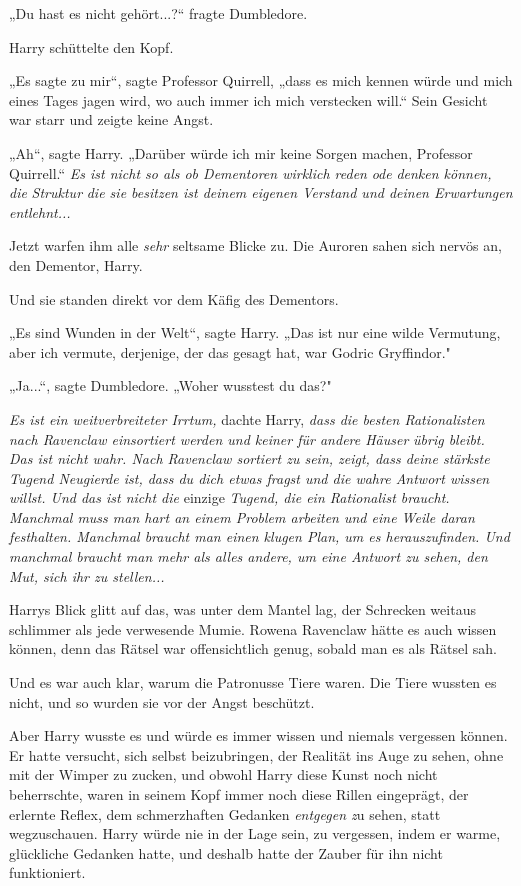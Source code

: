 {„Du hast es nicht gehört...?“ fragte Dumbledore.

Harry schüttelte den Kopf.

„Es sagte zu mir“, sagte Professor Quirrell, „dass es mich kennen würde und mich eines Tages jagen wird, wo auch immer ich mich verstecken will.“ Sein Gesicht war starr und zeigte keine Angst.

„Ah“, sagte Harry. „Darüber würde ich mir keine Sorgen machen, Professor Quirrell.“ \emph{Es ist nicht so als ob Dementoren wirklich reden} \emph{ode} \emph{denken können, die} \emph{Struktur} \emph{die sie besitzen ist deinem eigenen Verstand und deinen Erwartungen entlehnt...}

Jetzt warfen ihm alle \emph{sehr} seltsame Blicke zu. Die Auroren sahen sich nervös an, den Dementor, Harry.

Und sie standen direkt vor dem Käfig des Dementors.

„Es sind Wunden in der Welt“, sagte Harry. „Das ist nur eine wilde Vermutung, aber ich vermute, derjenige, der das gesagt hat, war Godric Gryffindor."

„Ja...“, sagte Dumbledore. „Woher wusstest du das?"

\emph{Es ist ein weitverbreiteter Irrtum,} dachte Harry, \emph{dass die besten Rationalisten nach Ravenclaw einsortiert werden und keiner für andere Häuser} \emph{übrig bleibt. Das ist nicht wahr. Nach Ravenclaw sortiert zu sein, zeigt, dass deine stärkste Tugend Neugierde ist, dass du dich etwas fragst und die wahre Antwort wissen willst. Und das ist nicht die} einzige \emph{Tugend, die ein Rationalist braucht. Manchmal muss man hart an einem Problem arbeiten und eine Weile daran festhalten. Manchmal braucht man einen klugen Plan, um es herauszufinden. Und manchmal braucht man mehr als alles andere, um eine Antwort zu sehen, den Mut, sich ihr zu stellen...}

Harrys Blick glitt auf das, was unter dem Mantel lag, der Schrecken weitaus schlimmer als jede verwesende Mumie. Rowena Ravenclaw hätte es auch wissen können, denn das Rätsel war offensichtlich genug, sobald man es als Rätsel sah.

Und es war auch klar, warum die Patronusse Tiere waren. Die Tiere wussten es nicht, und so wurden sie vor der Angst beschützt.

Aber Harry wusste es und würde es immer wissen und niemals vergessen können. Er hatte versucht, sich selbst beizubringen, der Realität ins Auge zu sehen, ohne mit der Wimper zu zucken, und obwohl Harry diese Kunst noch nicht beherrschte, waren in seinem Kopf immer noch diese Rillen eingeprägt, der erlernte Reflex, dem schmerzhaften Gedanken \emph{entgegen z}u sehen, statt wegzuschauen. Harry würde nie in der Lage sein, zu vergessen, indem er warme, glückliche Gedanken hatte, und deshalb hatte der Zauber für ihn nicht funktioniert.

}
